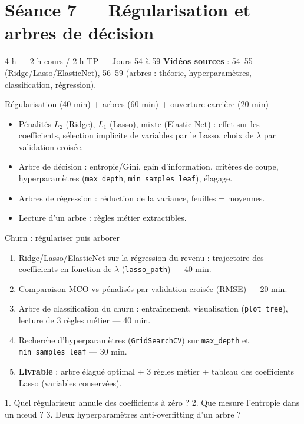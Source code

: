 \documentclass[11pt,a4paper]{article}
\begin{document}
\section*{Séance 7 — Régularisation et arbres de décision}
\begin{seancebox}{4 h — 2 h cours / 2 h TP — Jours 54 à 59}
\textbf{Vidéos sources} : 54--55 (Ridge/Lasso/ElasticNet), 56--59 (arbres : théorie, hyperparamètres, classification, régression).
\end{seancebox}
\begin{coursbox}{Régularisation (40 min) + arbres (60 min) + ouverture carrière (20 min)}
\begin{itemize}[nosep]
\item Pénalités $L_2$ (Ridge), $L_1$ (Lasso), mixte (Elastic Net) : effet sur les coefficients, sélection implicite de variables par le Lasso, choix de $\lambda$ par validation croisée.
\item Arbre de décision : entropie/Gini, gain d'information, critères de coupe, hyperparamètres (\texttt{max\_depth}, \texttt{min\_samples\_leaf}), élagage.
\item Arbres de régression : réduction de la variance, feuilles = moyennes.
\item Lecture d'un arbre : règles métier extractibles.
\end{itemize}
\end{coursbox}
\begin{tpbox}{Churn : régulariser puis arborer}
\begin{enumerate}[nosep]
\item Ridge/Lasso/ElasticNet sur la régression du revenu : trajectoire des coefficients en fonction de $\lambda$ (\texttt{lasso\_path}) — 40 min.
\item Comparaison MCO vs pénalisés par validation croisée (RMSE) — 20 min.
\item Arbre de classification du churn : entraînement, visualisation (\texttt{plot\_tree}), lecture de 3 règles métier — 40 min.
\item Recherche d'hyperparamètres (\texttt{GridSearchCV}) sur \texttt{max\_depth} et \texttt{min\_samples\_leaf} — 30 min.
\item \textbf{Livrable} : arbre élagué optimal + 3 règles métier + tableau des coefficients Lasso (variables conservées).
\end{enumerate}
\end{tpbox}
\begin{evalbox}
1. Quel régulariseur annule des coefficients à zéro ? 2. Que mesure l'entropie dans un nœud ? 3. Deux hyperparamètres anti-overfitting d'un arbre ?
\end{evalbox}
\end{document}
